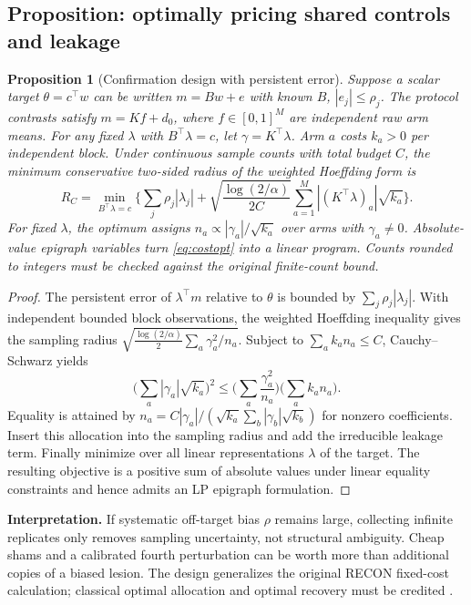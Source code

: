 \documentclass[11pt,a4paper]{article}
\newtheorem{proposition}[theorem]{Proposition}
\theoremstyle{definition}\newtheorem{definition}[theorem]{Definition}
\theoremstyle{remark}\newtheorem{remark}[theorem]{Remark}
\begin{document}
\subsection{Proposition: optimally pricing shared controls and leakage}
\begin{proposition}[Confirmation design with persistent error]\label{prop:alloc}
Suppose a scalar target $\theta=c^\top w$ can be written $m=Bw+e$ with known $B$, $|e_j|\le\rho_j$. The protocol contrasts satisfy $m=Kf+d_0$, where $f\in[0,1]^M$ are independent raw arm means. For any fixed $\lambda$ with $B^\top\lambda=c$, let $\gamma=K^\top\lambda$. Arm $a$ costs $k_a>0$ per independent block. Under continuous sample counts with total budget $C$, the minimum conservative two-sided radius of the weighted Hoeffding form is
\begin{equation}\label{eq:costopt}
 R_C=\min_{B^\top\lambda=c}\Bigg\{\sum_j\rho_j|\lambda_j|+
 \sqrt{\frac{\log(2/\alpha)}{2C}}\sum_{a=1}^{M}|(K^\top\lambda)_a|\sqrt{k_a}\Bigg\}.
\end{equation}
For fixed $\lambda$, the optimum assigns $n_a\propto |\gamma_a|/\sqrt{k_a}$ over arms with $\gamma_a\ne0$. Absolute-value epigraph variables turn \cref{eq:costopt} into a linear program. Counts rounded to integers must be checked against the original finite-count bound.
\end{proposition}
\begin{proof}
The persistent error of $\lambda^\top m$ relative to $\theta$ is bounded by $\sum_j\rho_j|\lambda_j|$. With independent bounded block observations, the weighted Hoeffding inequality gives the sampling radius
$\sqrt{\frac{\log(2/\alpha)}{2}\sum_a\gamma_a^2/n_a}$. Subject to $\sum_ak_an_a\le C$, Cauchy--Schwarz yields
\[
 \Big(\sum_a|\gamma_a|\sqrt{k_a}\Big)^2
 \le\Big(\sum_a\frac{\gamma_a^2}{n_a}\Big)\Big(\sum_ak_an_a\Big).
\]
Equality is attained by $n_a=C|\gamma_a|/(\sqrt{k_a}\sum_b|\gamma_b|\sqrt{k_b})$ for nonzero coefficients. Insert this allocation into the sampling radius and add the irreducible leakage term. Finally minimize over all linear representations $\lambda$ of the target. The resulting objective is a positive sum of absolute values under linear equality constraints and hence admits an LP epigraph formulation.\qedhere
\end{proof}
\textbf{Interpretation.} If systematic off-target bias $\rho$ remains large, collecting infinite replicates only removes sampling uncertainty, not structural ambiguity. Cheap shams and a calibrated fourth perturbation can be worth more than additional copies of a biased lesion. The design generalizes the original RECON fixed-cost calculation; classical optimal allocation and optimal recovery must be credited \citep{elfving,donoho}.
\end{document}

